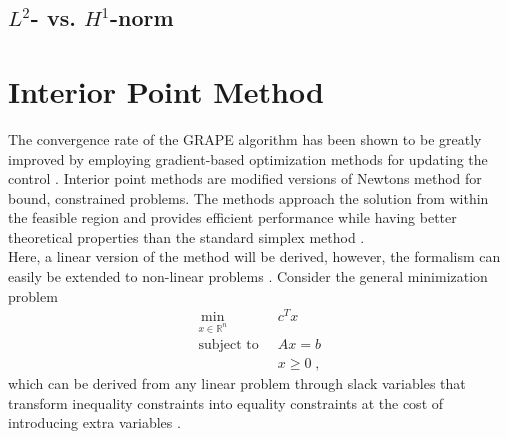 \subsection{ $L^2$- vs. $H^1$-norm }


\section{Interior Point Method}
The convergence rate of the GRAPE algorithm has been shown to be greatly improved by employing gradient-based optimization methods for updating the control \cite{Jager2014}.
Interior point methods are modified versions of Newtons method for bound, constrained problems. The methods approach the solution from within the feasible region and provides efficient performance while having better theoretical properties than the standard simplex method \cite{wright}.\\

Here, a linear version of the method will be derived, however, the formalism can easily be extended to non-linear problems \cite{wright}.
Consider the general minimization problem
 \begin{align*}
	\min_{x \in \mathbb{R}^n} \;  & \; c^T x \\
	\text{subject to} \;  & \; A x = b  \\
							& \; x \geq 0 \; ,
\end{align*}
which can be derived from any linear problem through slack variables that transform inequality constraints into equality constraints at the cost of introducing extra variables \cite{ipopt}.

